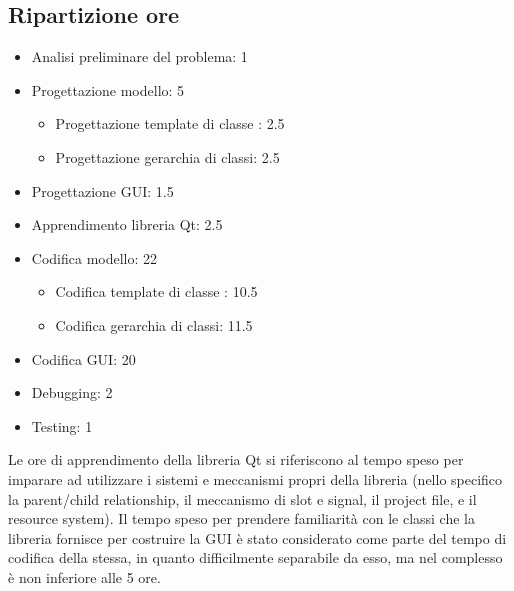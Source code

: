 \subsection{Ripartizione ore} %
\label{sub:ripartizione_ore}
\begin{itemize}
	\item Analisi preliminare del problema: 1
	\item Progettazione modello: 5
	\begin{itemize}
		\item Progettazione template di classe : 2.5
		\item Progettazione gerarchia di classi: 2.5
	\end{itemize}
	\item Progettazione GUI: 1.5
	\item Apprendimento libreria Qt: 2.5
	\item Codifica modello: 22
	\begin{itemize}
		\item Codifica template di classe : 10.5
		\item Codifica gerarchia di classi: 11.5
	\end{itemize}
	\item Codifica GUI: 20
	\item Debugging: 2
	\item Testing: 1
\end{itemize}
\begin{nota}
	Le ore di apprendimento della libreria Qt si riferiscono al tempo speso per imparare ad utilizzare i sistemi e meccanismi propri della libreria (nello specifico la parent/child relationship, il meccanismo di slot e signal, il project file, e il resource system). Il tempo speso per prendere familiarità con le classi che la libreria fornisce per costruire la GUI è stato considerato come parte del tempo di codifica della stessa, in quanto difficilmente separabile da esso, ma nel complesso è non inferiore alle 5 ore.
\end{nota}
